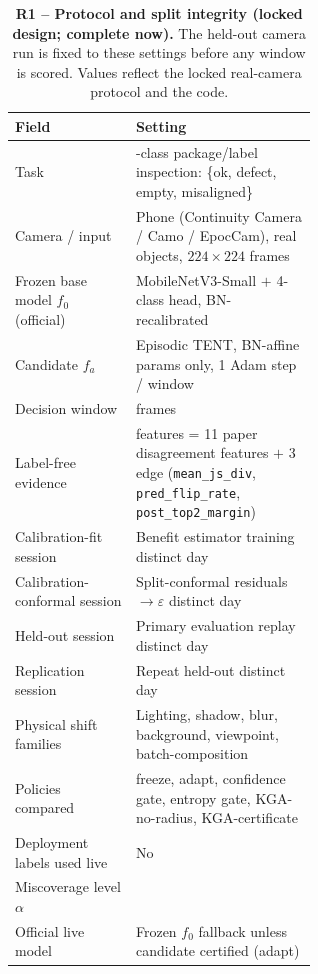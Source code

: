 \begin{table}[t]
  \centering
  \caption{\textbf{R1 -- Protocol and split integrity (locked design; complete
  now).} The held-out camera run is fixed to these settings before any window is
  scored. Values reflect the locked real-camera protocol and the code.}
  \label{tab:edge-r1}
  \small
  \begin{tabular}{@{}l >{\raggedright\arraybackslash}p{0.60\linewidth}@{}}
    \toprule
    Field & Setting \\
    \midrule
    Task & 4-class package/label inspection: \{ok, defect, empty, misaligned\} \\
    Camera / input & Phone (Continuity Camera / Camo / EpocCam), real objects, $224\times224$ frames \\
    Frozen base model $f_0$ (official) & MobileNetV3-Small $+$ 4-class head, BN-recalibrated \\
    Candidate $f_a$ & Episodic TENT, BN-affine params only, 1 Adam step / window \\
    Decision window & 32 frames \\
    Label-free evidence & 14 features = 11 paper disagreement features $+$ 3 edge (\texttt{mean\_js\_div}, \texttt{pred\_flip\_rate}, \texttt{post\_top2\_margin}) \\
    Calibration-fit session & Benefit estimator training \textemdash{} distinct day \\
    Calibration-conformal session & Split-conformal residuals $\rightarrow \varepsilon$ \textemdash{} distinct day \\
    Held-out session & Primary evaluation replay \textemdash{} distinct day \\
    Replication session & Repeat held-out \textemdash{} distinct day \\
    Physical shift families & Lighting, shadow, blur, background, viewpoint, batch-composition \\
    Policies compared & freeze, adapt, confidence gate, entropy gate, KGA-no-radius, KGA-certificate \\
    Deployment labels used live & No \\
    Miscoverage level $\alpha$ & 0.10 \\
    Official live model & Frozen $f_0$ fallback unless candidate certified (adapt) \\
    \bottomrule
  \end{tabular}
\end{table}

